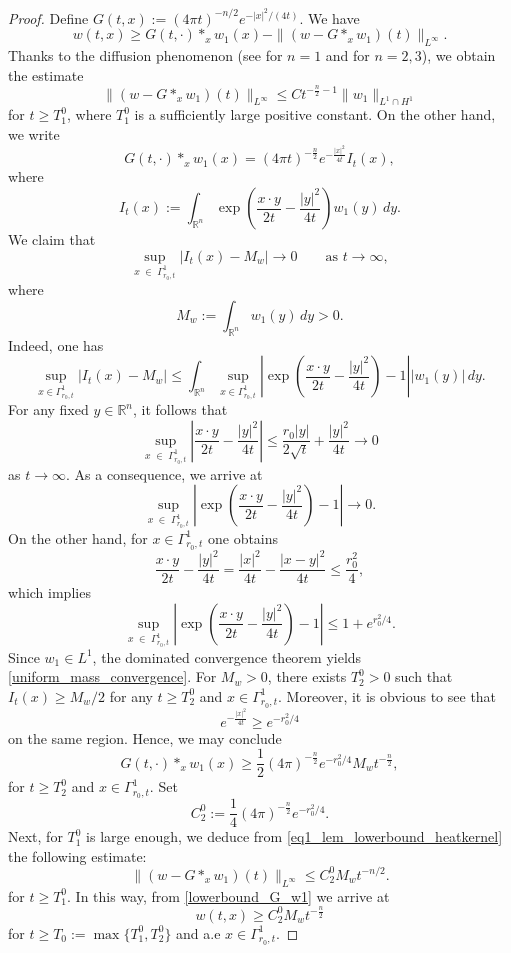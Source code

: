 \documentclass[11pt,reqno]{amsart}
\begin{document}
	\begin{proof}
		Define $G(t,x):=(4\pi t)^{-n/2}e^{-|x|^2/(4t)}$. We have
		\[
		w(t,x)\geq G(t,\cdot)\ast_x w_1(x)-\|(w-G\ast_x w_1)(t)\|_{L^{\infty}}.
		\]
		Thanks to the diffusion phenomenon (see \cite{Marcati2003} for $n=1$ and \cite{Narazaki2004} for $n=2,3$), we obtain the estimate
		\begin{equation}\label{eq1_lem_lowerbound_heatkernel}
			\|(w-G\ast_x w_1)(t)\|_{L^{\infty}}\leq C t^{-\frac{n}{2}-1}\|w_1\|_{L^1\cap H^1}
		\end{equation}
		for $t\geq T^0_1$, where $T^0_1$ is a sufficiently large positive constant. On the other hand, we write
		\[
		G(t,\cdot)\ast_x w_1(x)=(4\pi t)^{-\frac{n}{2}}e^{-\frac{|x|^2}{4t}}I_t(x),
		\]
		where
		\[
		I_t(x):=\int_{\mathbb R^n}\exp\left(\frac{x\cdot y}{2t}-\frac{|y|^2}{4t}\right)w_1(y)\,dy.
		\]
		We claim that
		\begin{equation}
			\label{uniform_mass_convergence}
			\sup_{x\;\in \;\Gamma^1_{r_0,t}}|I_t(x)-M_w|\to 0\qquad\text{as }t\to\infty,
		\end{equation}
		where
		\[
		M_w:=\int_{\mathbb R^n}w_1(y)\,dy>0.
		\]
		Indeed, one has
		\[
		\sup_{x\in \Gamma^1_{r_0,t}}|I_t(x)-M_w|\leq\int_{\mathbb R^n}\sup_{x\in \Gamma^1_{r_0,t}}\left|\exp\left(\frac{x\cdot y}{2t}-\frac{|y|^2}{4t}\right)-1\right||w_1(y)|\,dy.
		\]
		For any fixed $y\in\mathbb R^n$, it follows that
		\[
		\sup_{x\;\in\;\Gamma^1_{r_0,t}}\left|\frac{x\cdot y}{2t}-\frac{|y|^2}{4t}\right|\leq\frac{r_0|y|}{2\sqrt{t}}+\frac{|y|^2}{4t}\to 0
		\]
		as $t\to\infty$. As a consequence, we arrive at
		\[
		\sup_{x\;\in\;\Gamma^1_{r_0,t} }\left|\exp\left(\frac{x\cdot y}{2t}-\frac{|y|^2}{4t}\right)-1\right|\to 0.
		\]
		On the other hand, for $x\in \Gamma^1_{r_0,t}$ one obtains
		\[
		\frac{x\cdot y}{2t}-\frac{|y|^2}{4t}=\frac{|x|^2}{4t}-\frac{|x-y|^2}{4t}\leq \frac{r_0^2}{4},
		\]
		which implies
		\[
		\sup_{x\;\in\;\Gamma^1_{r_0,t}}\left|\exp\left(\frac{x\cdot y}{2t}-\frac{|y|^2}{4t}\right)-1\right|\leq 1+e^{r_0^2/4}.
		\]
		Since $w_1\in L^1$, the dominated convergence theorem yields \eqref{uniform_mass_convergence}. For $M_w>0$, there exists $T^0_2>0$ such that $I_t(x)\geq M_w/2$ for any $t\geq T^0_2$ and $x\in \Gamma^1_{r_0,t}$. Moreover, it is obvious to see that
		\[
		e^{-\frac{|x|^2}{4t}}\geq e^{-r_0^2/4}
		\]
		on the same region. Hence, we may conclude
		\begin{equation}\label{lowerbound_G_w1}
			G(t,\cdot)\ast_x w_1(x)\geq\frac{1}{2}(4\pi)^{-\frac{n}{2}}e^{-r_0^2/4} M_wt^{-\frac{n}{2}},
		\end{equation}
		for $t\geq T^0_2$ and $x\in \Gamma^1_{r_0,t}$. Set
		\[
		C^0_2:=\frac{1}{4}(4\pi)^{-\frac n2}e^{-r_0^2/4}.
		\]
		Next, for $T^0_1$ is large enough, we deduce from \eqref{eq1_lem_lowerbound_heatkernel} the following estimate:
		$$ \|(w-G\ast_x w_1)(t)\|_{L^{\infty}} \le C^0_2M_wt^{-n/2}. $$
		for $t\geq T^0_1$. In this way, from \eqref{lowerbound_G_w1} we arrive at
		\[
		w(t,x)\geq C^0_2M_wt^{-\frac n2}
		\]
		for $t\geq T_0:=\max\{T^0_1,T^0_2\}$ and a.e $x\in\Gamma^1_{r_0,t}$. 
	\end{proof}
\end{document}
